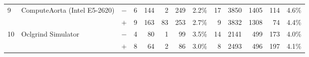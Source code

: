 \begin{tabular}{lll | rrrrr | rrrrr }
\hline
\multirow{ 2}{*}{9} & \multirow{ 2}{*}{ComputeAorta (Intel E5-2620)} & $-$ & 6 & 144 & 2 & 249 & 2.2\%       & 17 & 3850 & 1405 & 114 & 4.6\% \\& & $+$ & 9 & 163 & 83 & 253 & 2.7\% & 9 & 3832 & 1308 & 74 & 4.4\% \\
\hline
\multirow{ 2}{*}{10} & \multirow{ 2}{*}{Oclgrind Simulator} & $-$ & 4 & 80 & 1 & 99 & 3.5\%       & 14 & 2141 & 499 & 173 & 4.0\% \\& & $+$ & 8 & 64 & 2 & 86 & 3.0\% & 8 & 2493 & 496 & 197 & 4.1\% \\
  \bottomrule
\end{tabular}

